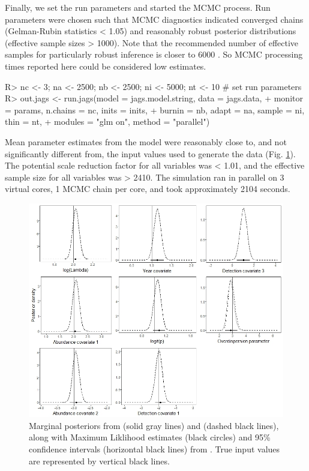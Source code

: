 \documentclass[article]{jss}
\begin{document}
Finally, we set the run parameters and started the MCMC process. Run parameters were chosen such that MCMC diagnostics indicated converged chains (Gelman-Rubin statistics < 1.05) and reasonably robust posterior distributions (effective sample sizes > 1000).  Note that the recommended number of effective samples for particularly robust inference is closer to 6000 \citep{Gong_Flegal_2016}.  So MCMC processing times reported here could be considered low estimates.

\begin{Code}
R> nc <- 3; na <- 2500; nb <- 2500; ni <- 5000; nt <- 10 # set run parameters
R> out.jags <- run.jags(model = jags.model.string, data = jags.data,
+                       monitor = params, n.chains = nc, inits = inits,
+                       burnin = nb, adapt = na, sample = ni, thin = nt,
+                       modules = "glm on", method = "parallel")
\end{Code}

Mean parameter estimates from the  model were reasonably close to, and not significantly different from, the input values used to generate the data (Fig. \ref{fig:fig1}).  The potential scale reduction factor for all variables was < 1.01, and the effective sample size for all variables was > 2410.  The simulation ran in parallel on 3 virtual cores, 1 MCMC chain per core, and took approximately 2104 seconds.

\begin{figure}
  \includegraphics[width=\linewidth]{fig1.jpeg}
  \caption{Marginal posteriors from  (solid gray lines) and  (dashed black lines), along with Maximum Liklihood estimates (black circles) and 95\% confidence intervals (horizontal black lines) from .  True input values are represented by vertical black lines.}
  \label{fig:fig1}
\end{figure}
\end{document}

